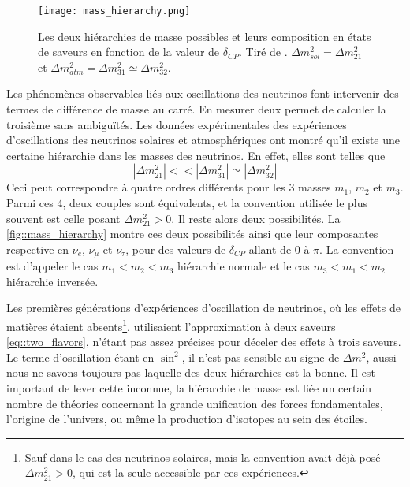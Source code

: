 		        \begin{figure}
		        	\texttt{[image: mass\_hierarchy.png]}
		        	\caption[Les deux hiérarchies de masse possibles]{\label{fig::mass_hierarchy}Les deux hiérarchies de masse possibles et leurs composition en états de saveurs en fonction de la valeur de $\delta_{CP}$. Tiré de \cite{Qian2015}. $\Delta m^2_{sol}=\Delta m^2_{21}$ et $\Delta m^2_{atm}=\Delta m^2_{31}\simeq\Delta m^2_{32}$.}
		        \end{figure}
	            Les phénomènes observables liés aux oscillations des neutrinos font intervenir des termes de différence de masse au carré. En mesurer deux permet de calculer la troisième sans ambiguïtés. Les données expérimentales des expériences d'oscillations des neutrinos solaires et atmosphériques ont montré qu'il existe une certaine hiérarchie dans les masses des neutrinos. En effet, elles sont telles que
	            \begin{equation}\label{eq::mass_hierarchy}
	            	|\Delta m^2_{21}| <<|\Delta m^2_{31}| \simeq |\Delta m^2_{32}| 
	            \end{equation}
	            Ceci peut correspondre à quatre ordres différents pour les 3 masses $m_1$, $m_2$ et $m_3$. Parmi ces 4, deux couples sont équivalents\cite{pdg2018}, et la convention utilisée le plus souvent est celle posant $\Delta m^2_{21} > 0$. Il reste alors deux possibilités. La \autoref{fig::mass_hierarchy} montre ces deux possibilités ainsi que leur composantes respective en $\nu_e$, $\nu_{\mu}$ et $\nu_{\tau}$, pour des valeurs de $\delta_{CP}$ allant de 0 à $\pi$\cite{Qian2015}. La convention est d'appeler le cas $m_1 < m_2 < m_3$ hiérarchie normale et le cas $m_3 < m_1 < m_2$ hiérarchie inversée.
	            
	            Les premières générations d'expériences d'oscillation de neutrinos, où les effets de matières étaient absents\footnote{Sauf dans le cas des neutrinos solaires, mais la convention avait déjà posé $\Delta m^2_{21} > 0$, qui est la seule accessible par ces expériences.}, utilisaient l'approximation à deux saveurs \eqref{eq::two_flavors}, n'étant pas assez précises pour déceler des effets à trois saveurs. Le terme d'oscillation étant en $\sin^2$, il n'est pas sensible au signe de $\Delta m^2$, aussi nous ne savons toujours pas laquelle des deux hiérarchies est la bonne. Il est important de lever cette inconnue, la hiérarchie de masse est liée  un certain nombre de théories concernant la grande unification des forces fondamentales, l'origine de l'univers, ou même la production d'isotopes au sein des étoiles\cite{KH-website}.
	            
